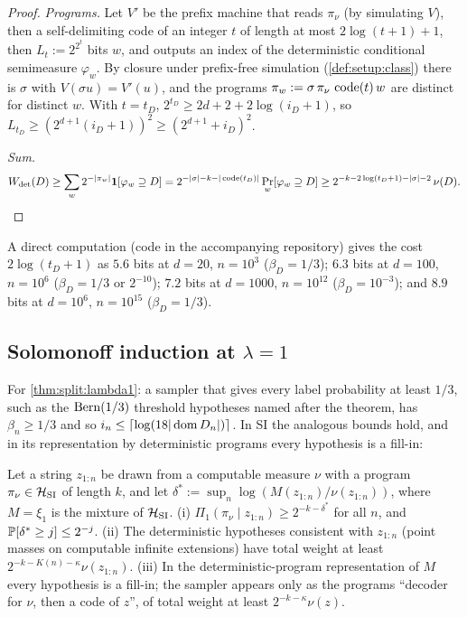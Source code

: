 \begin{proof}
\emph{Programs.} Let $V'$ be the prefix machine that reads $\pi_\nu$ (by simulating $V$), then a self-delimiting code of an integer $t$ of length at most $2\log(t+1)+1$, then $L_t:=2^{2^t}$ bits $w$, and outputs an index of the deterministic conditional semimeasure $\varphi_w$. By closure under prefix-free simulation (\cref{def:setup:class}) there is $\sigma$ with $V(\sigma u)=V'(u)$, and the programs $\pi_w:=\sigma\,\pi_\nu\,\operatorname{code}(t)\,w$ are distinct for distinct $w$. With $t=t_D$, $2^{t_D}\ge2d+2+2\log(i_D+1)$, so $L_{t_D}\ge(2^{d+1}(i_D+1))^2\ge(2^{d+1}+i_D)^2$.

\emph{Sum.}
\[
W_{\mathrm{det}}(D)\ge\sum_w2^{-|\pi_w|}\mathbf{1}[\varphi_w\supseteq D]=2^{-|\sigma|-k-|\operatorname{code}(t_D)|}\Pr_w[\varphi_w\supseteq D]\ge2^{-k-2\log(t_D+1)-|\sigma|-2}\,\nu(D).\qedhere
\]
\end{proof}

A direct computation (code in the accompanying repository) gives the cost $2\log(t_D+1)$ as $5.6$ bits at $d=20$, $n=10^3$ ($\beta_D=1/3$); $6.3$ bits at $d=100$, $n=10^6$ ($\beta_D=1/3$ or $2^{-10}$); $7.2$ bits at $d=1000$, $n=10^{12}$ ($\beta_D=10^{-3}$); and $8.9$ bits at $d=10^6$, $n=10^{15}$ ($\beta_D=1/3$).

\subsection{Solomonoff induction at \texorpdfstring{$\lambda=1$}{lambda=1}}\label{app:split:si}

For \cref{thm:split:lambda1}: a sampler that gives every label probability at least $1/3$, such as the $\operatorname{Bern}(1/3)$ threshold hypotheses named after the theorem, has $\beta_n\ge1/3$ and so $i_n\le\lceil\log(18|\operatorname{dom} D_n|)\rceil$. In SI the analogous bounds hold, and in its representation by deterministic programs every hypothesis is a fill-in:

\begin{proposition}[SI at $\lambda=1$]\label{prop:split:si}
Let a string $z_{1:n}$ be drawn from a computable measure $\nu$ with a program $\pi_\nu\in\mathcal{H}_{\mathrm{SI}}$ of length $k$, and let $\delta^*:=\sup_n\log(M(z_{1:n})/\nu(z_{1:n}))$, where $M=\xi_1$ is the mixture of $\mathcal{H}_{\mathrm{SI}}$.
(i) $\Pi_1(\pi_\nu\mid z_{1:n})\ge2^{-k-\delta^*}$ for all $n$, and $\mathbb{P}[\delta^*\ge j]\le2^{-j}$. (ii) The deterministic hypotheses consistent with $z_{1:n}$ (point masses on computable infinite extensions) have total weight at least $2^{-k-K(n)-\kappa}\nu(z_{1:n})$. (iii) In the deterministic-program representation of $M$ every hypothesis is a fill-in; the sampler appears only as the programs ``decoder for $\nu$, then a code of $z$'', of total weight at least $2^{-k-\kappa}\nu(z)$.
\end{proposition}

